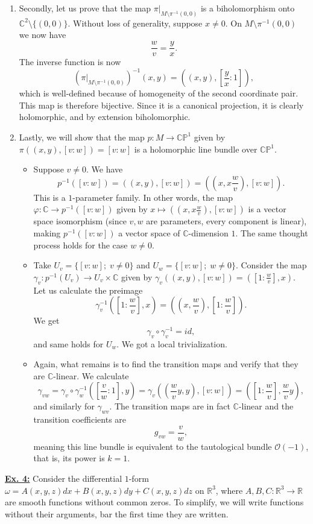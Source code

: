 \documentclass[a4paper, 12pt]{article} %
\newcommand{\R}{\mathbb{R}}
\newcommand{\C}{\mathbb{C}}
\renewcommand{\P}{\mathbb{P}}
\begin{document}
\begin{enumerate}[label=(\alph*)]
	\item Secondly, let us prove that the map $\pi|_{M \setminus \pi^{-1}(0, 0)}$ is a biholomorphism onto $\C^2\setminus\lbrace(0, 0)\rbrace$. Without loss of generality, suppose $x \neq 0$. On $M \setminus \pi^{-1}(0, 0)$ we now have
	\[
	\frac{w}{v} = \frac{y}{x}.
	\]
	The inverse function is now
	\[
	(\pi|_{M \setminus \pi^{-1}(0, 0)})^{-1}(x, y) = ((x, y), [\frac{y}{x}:1]),
	\]
	which is well-defined because of homogeneity of the second coordinate pair. This map is therefore bijective. Since it is a canonical projection, it is clearly holomorphic, and by extension biholomorphic.
	\item Lastly, we will show that the map $p\colon M \to \C\P^1$ given by $\pi((x, y), [v:w]) = [v:w]$ is a holomorphic line bundle over $\C\P^1$.
	\begin{itemize}
		\item Suppose $v \neq 0$. We have
		\[
		p^{-1}([v:w]) = ((x, y),[v:w]) = ((x, x\frac{w}{v}), [v:w]).
		\]
		This is a $1$-parameter family. In other words, the map $\varphi\colon\C\to p^{-1}([v:w])$ given by $x \mapsto ((x, x \frac{w}{v}), [v:w])$ is a vector space isomorphism (since $v, w$ are parameters, every component is linear), making $p^{-1}([v:w])$ a vector space of $\C$-dimension $1$. The same thought process holds for the case $w \neq 0$.
		\item Take $U_v = \lbrace [v:w] ; \; v \neq 0 \rbrace$ and $U_w = \lbrace [v:w] ; \; w \neq 0 \rbrace$. Consider the map $\gamma_v \colon p^{-1}(U_v) \to U_v \times \C$ given by $\gamma_v((x, y), [v:w]) = ([1:\frac{w}{v}], x)$. Let us calculate the preimage
		\[
		\gamma_{v}^{-1}([1:\frac{w}{v}], x) = ((x, \frac{w}{v}), [1:\frac{w}{v}]).
		\]
		We get
		\[
		\gamma_v\circ\gamma_v^{-1} = id,
		\]
		and same holds for $U_w$. We got a local trivialization.
		\item Again, what remains is to find the transition maps and verify that they are $\C$-linear. We calculate
		\[
		\gamma_{vw} = \gamma_{v}\circ\gamma_{w}^{-1}([\frac{v}{w}:1], y) = \gamma_v((\frac{w}{v}y, y), [v:w]) = ([1:\frac{w}{v}], \frac{w}{v}y),
		\]
		and similarly for $\gamma_{wv}$.
		The transition maps are in fact $\C$-linear and the transition coefficients are
		\[
		g_{vw} = \frac{v}{w},
		\]
		meaning this line bundle is equivalent to the tautological bundle $\mathcal{O}(-1)$, that is, its power is $k = 1$.
	\end{itemize}
\end{enumerate}

\underline{\textbf{Ex. 4:}}
Consider the differential $1$-form $\omega = A(x, y, z)dx + B(x, y, z)dy + C(x, y, z)dz$ on $\R^3$, where $A, B, C \colon \R^3 \to \R$ are smooth functions without common zeros. To simplify, we will write functions without their arguments, bar the first time they are written.
\end{document}
